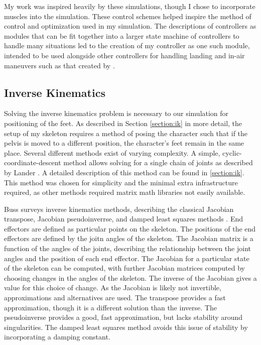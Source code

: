 My work was inspired heavily by these simulations, though I chose to incorporate muscles into the simulation.  These control schemes helped inspire the method of control and optimization used in my simulation.  The descriptions of controllers as modules that can be fit together into a larger state machine of controllers to handle many situations led to the creation of my controller as one such module, intended to be used alongside other controllers for handling landing and in-air maneuvers such as that created by \liufall{}.

\subsection{Inverse Kinematics}
\label{subsection:ik_bg}
Solving the inverse kinematics problem is necessary to our simulation for positioning of the feet.  As described in Section \ref{section:ik} in more detail, the setup of my skeleton requires a method of posing the character such that if the pelvis is moved to a different position, the character's feet remain in the same place.  Several different methods exist of varying complexity.  A simple, cyclic-coordinate-descent method allows solving for a single chain of joints as described by Lander \cite{kine1, kine2}. A detailed description of this method can be found in \ref{section:ik}.  This method was chosen for simplicity and the minimal extra infrastructure required, as other methods required matrix math libraries not easily available.

Buss surveys inverse kinematics methods, describing the classical Jacobian transpose, Jacobian pseudoinverrse, and damped least squares methods \cite{buss_ik}.  End effectors are defined as particular points on the skeleton.  The positions of the end effectors are defined by the joitn angles of the skeleton.  The Jacobian matrix is a function of the angles of the joints, describing the relationship between the joint angles and the position of each end effector.  The Jacobian for a particular state of the skeleton can be computed, with further Jacobian matrices computed by choosing changes in the angles of the skeleton.  The inverse of the Jacobian gives a value for this choice of change.  As the Jacobian is likely not invertible, approximations and alternatives are used.  The transpose provides a fast approximation, though it is a different solution than the inverse.  The pseudoinverse provides a good, fast approximation, but lacks stability around singularities.  The damped least squares method avoids this issue of stability by incorporating a damping constant.

